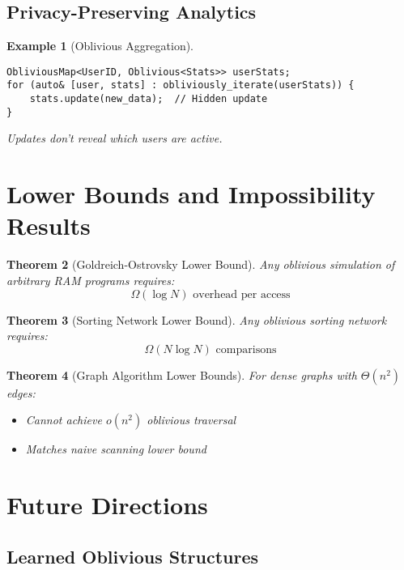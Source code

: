 \documentclass[11pt,final,hidelinks]{article}
\newtheorem{theorem}{Theorem}[section]
\newtheorem{example}[theorem]{Example}
\begin{document}
\subsection{Privacy-Preserving Analytics}

\begin{example}[Oblivious Aggregation]
\begin{verbatim}
ObliviousMap<UserID, Oblivious<Stats>> userStats;
for (auto& [user, stats] : obliviously_iterate(userStats)) {
    stats.update(new_data);  // Hidden update
}
\end{verbatim}
Updates don't reveal which users are active.
\end{example}

\section{Lower Bounds and Impossibility Results}

\begin{theorem}[Goldreich-Ostrovsky Lower Bound]
Any oblivious simulation of arbitrary RAM programs requires:
\begin{equation}
\Omega(\log N) \text{ overhead per access}
\end{equation}
\end{theorem}

\begin{theorem}[Sorting Network Lower Bound]
Any oblivious sorting network requires:
\begin{equation}
\Omega(N \log N) \text{ comparisons}
\end{equation}
\end{theorem}

\begin{theorem}[Graph Algorithm Lower Bounds]
For dense graphs with $\Theta(n^2)$ edges:
\begin{itemize}
    \item Cannot achieve $o(n^2)$ oblivious traversal
    \item Matches naive scanning lower bound
\end{itemize}
\end{theorem}

\section{Future Directions}

\subsection{Learned Oblivious Structures}
\end{document}
